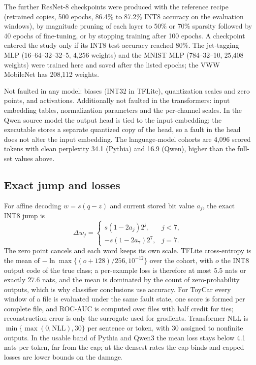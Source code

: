 The further ResNet-8 checkpoints were produced with the reference recipe (retrained copies, 500 epochs, 86.4\% to 87.2\% INT8 accuracy on the evaluation windows), by magnitude pruning of each layer to 50\% or 70\% sparsity followed by 40 epochs of fine-tuning, or by stopping training after 100 epochs. A checkpoint entered the study only if its INT8 test accuracy reached 80\%. The jet-tagging MLP (16--64--32--32--5, 4,256 weights) and the MNIST MLP (784--32--10, 25,408 weights) were trained here and saved after the listed epochs; the VWW MobileNet has 208,112 weights.

Not faulted in any model: biases (INT32 in TFLite), quantization scales and zero points, and activations. Additionally not faulted in the transformers: input embedding tables, normalization parameters and the per-channel scales. In the Qwen source model the output head is tied to the input embedding; the executable stores a separate quantized copy of the head, so a fault in the head does not alter the input embedding. The language-model cohorts are 4,096 scored tokens with clean perplexity 34.1 (Pythia) and 16.9 (Qwen), higher than the full-set values above.

\subsection{Exact jump and losses}
For affine decoding $w=s(q-z)$ and current stored bit value $a_j$, the exact INT8 jump is
\begin{equation}\label{eq:xor-delta}
\Delta w_j=\begin{cases}s(1-2a_j)2^j,&j<7,\\-s(1-2a_7)2^7,&j=7.\end{cases}
\end{equation}
The zero point cancels and each word keeps its own scale. TFLite cross-entropy is the mean of $-\ln\max\{(o+128)/256,10^{-12}\}$ over the cohort, with $o$ the INT8 output code of the true class; a per-example loss is therefore at most 5.5 nats or exactly 27.6 nats, and the mean is dominated by the count of zero-probability outputs, which is why classifier conclusions use accuracy. For ToyCar every window of a file is evaluated under the same fault state, one score is formed per complete file, and ROC-AUC is computed over files with half credit for ties; reconstruction error is only the surrogate used for gradients. Transformer NLL is $\min\{\max(0,\mathrm{NLL}),30\}$ per sentence or token, with 30 assigned to nonfinite outputs. In the usable band of Pythia and Qwen3 the mean loss stays below 4.1 nats per token, far from the cap; at the densest rates the cap binds and capped losses are lower bounds on the damage.

